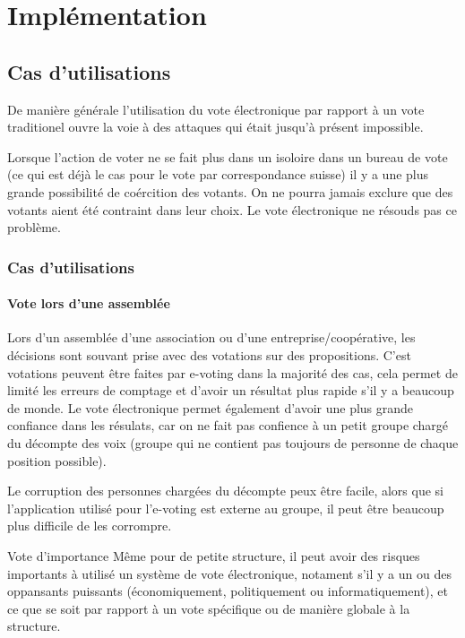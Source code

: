\documentclass[../report]{subfiles}
\begin{document}
\part{Implémentation}

\chapter{Cas d'utilisations}

De manière générale l'utilisation du vote électronique par rapport à un vote traditionel ouvre la voie à 
des attaques qui était jusqu'à présent impossible. 

Lorsque l'action de voter ne se fait plus dans un isoloire dans un bureau de vote (ce qui est déjà le cas
pour le vote par correspondance suisse) il y a une plus grande possibilité de coércition des votants.
On ne pourra jamais exclure que des votants aient été contraint dans leur choix. 
Le vote électronique ne résouds pas ce problème.

\section{Cas d'utilisations}
\subsection{Vote lors d'une assemblée}

Lors d'un assemblée d'une association ou d'une entreprise/coopérative, les décisions sont souvant prise avec
des votations sur des propositions.
C'est votations peuvent être faites par e-voting dans la majorité des cas, cela permet de limité les erreurs 
de comptage et d'avoir un résultat plus rapide s'il y a beaucoup de monde.
Le vote électronique permet également d'avoir une plus grande confiance dans les résulats, car on ne fait pas 
confience à un petit groupe chargé du décompte des voix (groupe qui ne contient pas toujours de personne de 
chaque position possible).

Le corruption des personnes chargées du décompte peux être facile, alors que si l'application utilisé pour
l'e-voting est externe au groupe, il peut être beaucoup plus difficile de les corrompre.

\begin{important}{Vote d'importance}
  Même pour de petite structure, il peut avoir des risques importants à utilisé un système de vote électronique, 
  notament s'il y a un ou des oppansants puissants (économiquement, politiquement ou informatiquement), et ce que
  se soit par rapport à un vote spécifique ou de manière globale à la structure.
\end{important}
\end{document}
